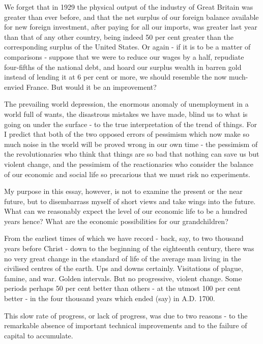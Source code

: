We forget that in 1929 the physical output of the industry of Great Britain was greater than ever before, and that the net surplus of our foreign balance available for new foreign investment, after paying for all our imports, was greater last year than that of any other country, being indeed 50 per cent greater than the corresponding surplus of the United States. Or again - if it is to be a matter of comparisons - suppose that we were to reduce our wages by a half, repudiate four-fifths of the national debt, and hoard our surplus wealth in barren gold instead of lending it at 6 per cent or more, we should resemble the now much-envied France. But would it be an improvement?\par

The prevailing world depression, the enormous anomaly of unemployment in a world full of wants, the disastrous mistakes we have made, blind us to what is going on under the surface - to the true interpretation of the trend of things. For I predict that both of the two opposed errors of pessimism which now make so much noise in the world will be proved wrong in our own time - the pessimism of the revolutionaries who think that things are so bad that nothing can save us but violent change, and the pessimism of the reactionaries who consider the balance of our economic and social life so precarious that we must risk no experiments.\par

My purpose in this essay, however, is not to examine the present or the near future, but to disembarrass myself of short views and take wings into the future. What can we reasonably expect the level of our economic life to be a hundred years hence? What are the economic possibilities for our grandchildren?\par

From the earliest times of which we have record - back, say, to two thousand years before Christ - down to the beginning of the eighteenth century, there was no very great change in the standard of life of the average man living in the civilised centres of the earth. Ups and downs certainly. Visitations of plague, famine, and war. Golden intervals. But no progressive, violent change. Some periods perhaps 50 per cent better than others - at the utmost 100 per cent better - in the four thousand years which ended (say) in A.D. 1700.\par

This slow rate of progress, or lack of progress, was due to two reasons - to the remarkable absence of important technical improvements and to the failure of capital to accumulate.\par

